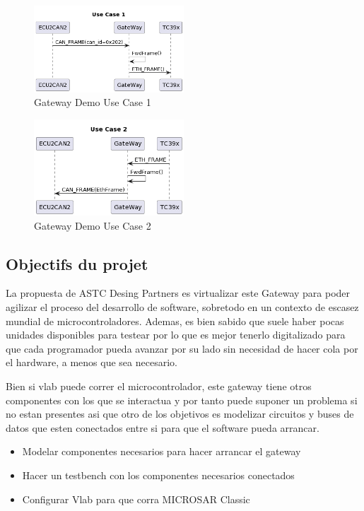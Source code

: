 \begin{figure}[!htb]
 \centering
 \includegraphics[width=0.5\textwidth]{img/GWUseCase1.png}
 \caption{Gateway Demo Use Case 1}
 \label{fig:gw-demo-uc1}
\end{figure}

\begin{figure}[!htb]
 \centering
 \includegraphics[width=0.5\textwidth]{img/GWUseCase2.png}
 \caption{Gateway Demo Use Case 2}
 \label{fig:gw-demo-uc2}
\end{figure}

\subsection{Objectifs du projet}

La propuesta de ASTC Desing Partners es virtualizar este Gateway para poder agilizar el proceso del desarrollo de software, sobretodo en un contexto de escasez mundial de microcontroladores. Ademas, es bien sabido que suele haber pocas unidades disponibles para testear por lo que es mejor tenerlo digitalizado para que cada programador pueda avanzar por su lado sin necesidad de hacer cola por el hardware, a menos que sea necesario.

Bien si vlab puede correr el microcontrolador, este gateway tiene otros componentes con los que se interactua y por tanto puede suponer un problema si no estan presentes asi que otro de los objetivos es modelizar circuitos y buses de datos que esten conectados entre si para que el software pueda arrancar.
\begin{itemize}
    \item Modelar componentes necesarios para hacer arrancar el gateway
    \item Hacer un testbench con los componentes necesarios conectados
    \item Configurar Vlab para que corra MICROSAR Classic
\end{itemize}